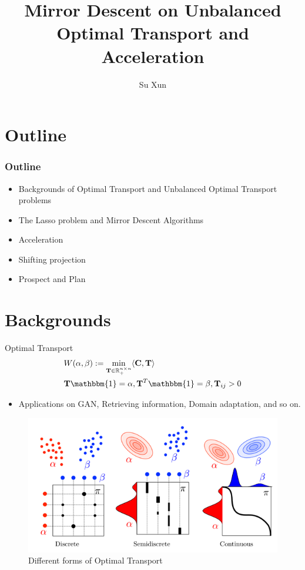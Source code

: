 \documentclass[dvipdfmx,cjk,t,10pt]{beamer}
\newcommand{\C}{\mathbf C}
\begin{document}
\title{Mirror Descent on Unbalanced Optimal Transport and Acceleration}

\author[shortname]{Su Xun}

\begin{frame}
\titlepage
	
	\vspace*{-0.5cm}
\end{frame}

\section{Outline}
\begin{frame}
\frametitle{Outline}

	\begin{itemize}
	\item Backgrounds of Optimal Transport and Unbalanced Optimal Transport problems
	\itemspace	
	\item The Lasso problem and Mirror Descent Algorithms
	\itemspace	
	\item Acceleration 
	\itemspace	
	\item Shifting projection
	\itemspace
	\item Prospect and Plan
	\itemspace
	\end{itemize}		
\end{frame}


\section{Backgrounds}
\begin{frame}
	\begin{screen}{Optimal Transport}
$$
\begin{aligned}
&W(\alpha,\beta) := \min_{ \mathbf{T} \in \mathbb{R}_{+}^{n \times n}} \langle \C, \mathbf{T} \rangle \\
& \mathbf{T} \mathbbm{1} = \alpha, \mathbf{T}^{T}\mathbbm{1} = \beta, \mathbf{T}_{ij}>0
\end{aligned}
$$
\end{screen}	
	\begin{itemize}
	\item Applications on GAN, Retrieving information, Domain adaptation, and so on.
	\end{itemize}	
	\begin{figure}[htbp]
	\begin{center}	
	\includegraphics[width=0.5\hsize]{pic/ot}
	\caption{Different forms of Optimal Transport}
	\end{center}	
	\end{figure}			
	
\end{frame}
\end{document}
